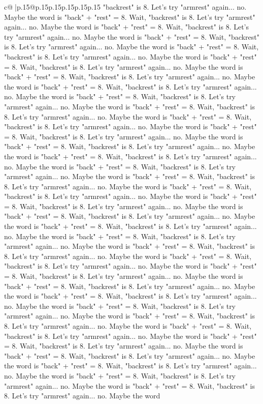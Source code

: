 \documentclass{article}
\begin{document}
{\begin{supertabular}{c@{$\;$}|p{.15\linewidth}@{}p{.15\linewidth}p{.15\linewidth}p{.15\linewidth}p{.15\linewidth}p{.15\linewidth}}
{{{"backrest" is 8. Let's try "armrest" again... no. Maybe the word is "back" + "rest" = 8. Wait, "backrest" is 8. Let's try "armrest" again... no. Maybe the word is "back" + "rest" = 8. Wait, "backrest" is 8. Let's try "armrest" again... no. Maybe the word is "back" + "rest" = 8. Wait, "backrest" is 8. Let's try "armrest" again... no. Maybe the word is "back" + "rest" = 8. Wait, "backrest" is 8. Let's try "armrest" again... no. Maybe the word is "back" + "rest" = 8. Wait, "backrest" is 8. Let's try "armrest" again... no. Maybe the word is "back" + "rest" = 8. Wait, "backrest" is 8. Let's try "armrest" again... no. Maybe the word is "back" + "rest" = 8. Wait, "backrest" is 8. Let's try "armrest" again... no. Maybe the word is "back" + "rest" = 8. Wait, "backrest" is 8. Let's try "armrest" again... no. Maybe the word is "back" + "rest" = 8. Wait, "backrest" is 8. Let's try "armrest" again... no. Maybe the word is "back" + "rest" = 8. Wait, "backrest" is 8. Let's try "armrest" again... no. Maybe the word is "back" + "rest" = 8. Wait, "backrest" is 8. Let's try "armrest" again... no. Maybe the word is "back" + "rest" = 8. Wait, "backrest" is 8. Let's try "armrest" again... no. Maybe the word is "back" + "rest" = 8. Wait, "backrest" is 8. Let's try "armrest" again... no. Maybe the word is "back" + "rest" = 8. Wait, "backrest" is 8. Let's try "armrest" again... no. Maybe the word is "back" + "rest" = 8. Wait, "backrest" is 8. Let's try "armrest" again... no. Maybe the word is "back" + "rest" = 8. Wait, "backrest" is 8. Let's try "armrest" again... no. Maybe the word is "back" + "rest" = 8. Wait, "backrest" is 8. Let's try "armrest" again... no. Maybe the word is "back" + "rest" = 8. Wait, "backrest" is 8. Let's try "armrest" again... no. Maybe the word is "back" + "rest" = 8. Wait, "backrest" is 8. Let's try "armrest" again... no. Maybe the word is "back" + "rest" = 8. Wait, "backrest" is 8. Let's try "armrest" again... no. Maybe the word is "back" + "rest" = 8. Wait, "backrest" is 8. Let's try "armrest" again... no. Maybe the word is "back" + "rest" = 8. Wait, "backrest" is 8. Let's try "armrest" again... no. Maybe the word is "back" + "rest" = 8. Wait, "backrest" is 8. Let's try "armrest" again... no. Maybe the word is "back" + "rest" = 8. Wait, "backrest" is 8. Let's try "armrest" again... no. Maybe the word is "back" + "rest" = 8. Wait, "backrest" is 8. Let's try "armrest" again... no. Maybe the word is "back" + "rest" = 8. Wait, "backrest" is 8. Let's try "armrest" again... no. Maybe the word is "back" + "rest" = 8. Wait, "backrest" is 8. Let's try "armrest" again... no. Maybe the word is "back" + "rest" = 8. Wait, "backrest" is 8. Let's try "armrest" again... no. Maybe the word is "back" + "rest" = 8. Wait, "backrest" is 8. Let's try "armrest" again... no. Maybe the word is "back" + "rest" = 8. Wait, "backrest" is 8. Let's try "armrest" again... no. Maybe the word is "back" + "rest" = 8. Wait, "backrest" is 8. Let's try "armrest" again... no. Maybe the word is "back" + "rest" = 8. Wait, "backrest" is 8. Let's try "armrest" again... no. Maybe the word is "back" + "rest" = 8. Wait, "backrest" is 8. Let's try "armrest" again... no. Maybe the word }}}
\end{supertabular}}
\end{document}
